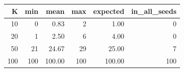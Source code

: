 \begin{tabular}{rrrrrr}
\toprule
K & min & mean & max & expected & in_all_seeds \\
\midrule
10 & 0 & 0.83 & 2 & 1.00 & 0 \\
20 & 1 & 2.50 & 6 & 4.00 & 0 \\
50 & 21 & 24.67 & 29 & 25.00 & 7 \\
100 & 100 & 100.00 & 100 & 100.00 & 100 \\
\bottomrule
\end{tabular}
